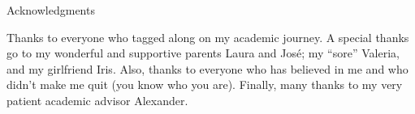 \thispagestyle{empty}

\vspace*{20mm}

\begin{center}
{ Acknowledgments}
\end{center}

\vspace{10mm}

Thanks to everyone who tagged along on my academic journey.
A special thanks go to my wonderful and supportive parents Laura and José; my ``sore'' Valeria, and my girlfriend Iris.
Also, thanks to everyone who has believed in me and who didn't make me quit (you know who you are).
Finally, many thanks to my very patient academic advisor Alexander.

\cleardoublepage{}
